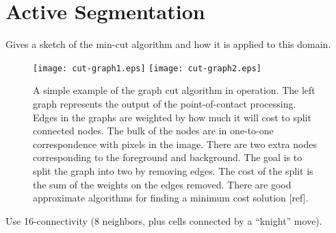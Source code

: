 
\ifverbose

\section{Active Segmentation}

Gives a sketch of the min-cut algorithm and how it is applied to
this domain.

\begin{figure*}[tbh]
\begin{center}
\texttt{[image: cut-graph1.eps]}
\hspace{1cm}
\texttt{[image: cut-graph2.eps]}
\caption{ 
\label{fig:cut-graph}
%
A simple example of the graph cut algorithm in operation.  
The left graph represents the output of the point-of-contact 
processing.  Edges in the graphs are weighted by how much
it will cost to split connected nodes.  The bulk of the nodes
are in one-to-one correspondence with pixels in the image.
There are two extra nodes corresponding to the foreground and
background.  The goal is to split the graph into two by removing
edges.  The cost of the split is the sum of the weights on the 
edges removed.  There are good approximate algorithms for
finding a minimum cost solution [ref].
%
}
\end{center}
\end{figure*}

Use 16-connectivity (8 neighbors, plus cells connected by a
``knight'' move).

\fi
